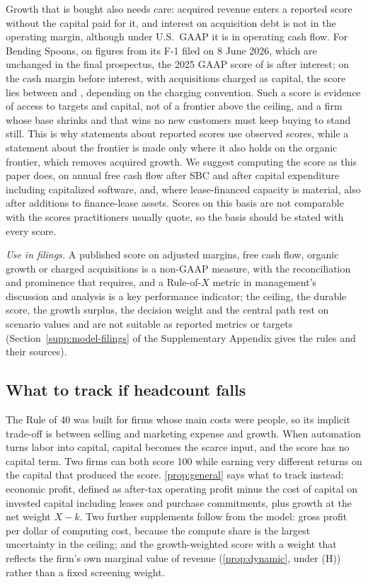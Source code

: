 Growth that is bought also needs care: acquired revenue enters a reported score without the capital paid for it, and interest on acquisition debt is not in the operating margin, although under U.S.\ GAAP it is in operating cash flow. For Bending Spoons, on figures from its F-1 filed on 8 June 2026, which are unchanged in the final prospectus, the 2025 GAAP score of \acqRGaapTwentyFive{} is \acqRIntTwentyFive{} after interest; on the cash margin before interest, with acquisitions charged as capital, the score lies between \acqConvLo{} and \acqConvHi, depending on the charging convention. Such a score is evidence of access to targets and capital, not of a frontier above the ceiling, and a firm whose base shrinks and that wins no new customers must keep buying to stand still. This is why statements about reported scores use observed scores, while a statement about the frontier is made only where it also holds on the organic frontier, which removes acquired growth. We suggest computing the score as this paper does, on annual free cash flow after SBC and after capital expenditure including capitalized software, and, where lease-financed capacity is material, also after additions to finance-lease assets. Scores on this basis are not comparable with the scores practitioners usually quote, so the basis should be stated with every score.

\emph{Use in filings.} A published score on adjusted margins, free cash flow, organic growth or charged acquisitions is a non-GAAP measure, with the reconciliation and prominence that requires, and a Rule-of-$X$ metric in management's discussion and analysis is a key performance indicator; the ceiling, the durable score, the growth surplus, the decision weight and the central path rest on scenario values and are not suitable as reported metrics or targets (Section~\ref{supp:model-filings} of the Supplementary Appendix gives the rules and their sources).

\subsection{What to track if headcount falls}
The Rule of 40 was built for firms whose main costs were people, so its implicit trade-off is between selling and marketing expense and growth. When automation turns labor into capital, capital becomes the scarce input, and the score has no capital term. Two firms can both score 100 while earning very different returns on the capital that produced the score. \autoref{prop:general} says what to track instead: economic profit, defined as after-tax operating profit minus the cost of capital on invested capital including leases and purchase commitments, plus growth at the net weight $X-k$. Two further supplements follow from the model: gross profit per dollar of computing cost, because the compute share is the largest uncertainty in the ceiling; and the growth-weighted score with a weight that reflects the firm's own marginal value of revenue (\autoref{prop:dynamic}, under (H)) rather than a fixed screening weight.

